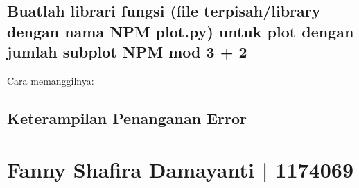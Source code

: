 \subsection{Buatlah librari fungsi (file terpisah/library dengan nama NPM plot.py) untuk plot dengan jumlah subplot NPM mod 3 + 2}



Cara memanggilnya:



\subsection{Keterampilan Penanganan Error}



\section{Fanny Shafira Damayanti | 1174069}
